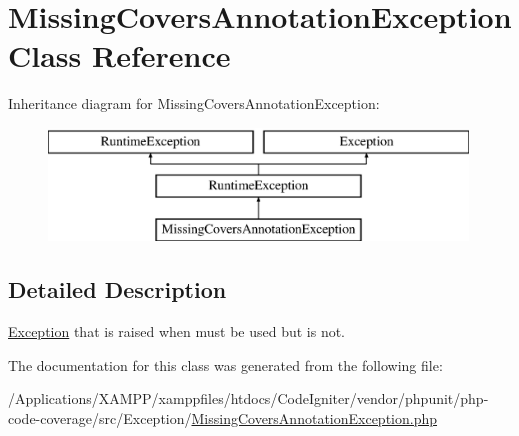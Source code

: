 \hypertarget{class_sebastian_bergmann_1_1_code_coverage_1_1_missing_covers_annotation_exception}{}\section{Missing\+Covers\+Annotation\+Exception Class Reference}
\label{class_sebastian_bergmann_1_1_code_coverage_1_1_missing_covers_annotation_exception}
Inheritance diagram for Missing\+Covers\+Annotation\+Exception\+:\begin{figure}[H]
\begin{center}
\leavevmode
\includegraphics[height=3.000000cm]{class_sebastian_bergmann_1_1_code_coverage_1_1_missing_covers_annotation_exception}
\end{center}
\end{figure}


\subsection{Detailed Description}
\mbox{\hyperlink{interface_sebastian_bergmann_1_1_code_coverage_1_1_exception}{Exception}} that is raised when  must be used but is not. 

The documentation for this class was generated from the following file\+:\begin{DoxyCompactItemize}
\item 
/\+Applications/\+X\+A\+M\+P\+P/xamppfiles/htdocs/\+Code\+Igniter/vendor/phpunit/php-\/code-\/coverage/src/\+Exception/\mbox{\hyperlink{php-code-coverage_2src_2_exception_2_missing_covers_annotation_exception_8php}{Missing\+Covers\+Annotation\+Exception.\+php}}\end{DoxyCompactItemize}
